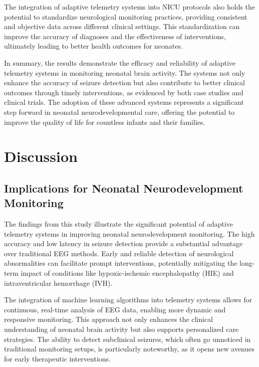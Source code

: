 \documentclass[12pt,journal,compsoc]{IEEEtran}
\begin{document}
The integration of adaptive telemetry systems into NICU protocols also holds the potential to standardize neurological monitoring practices, providing consistent and objective data across different clinical settings. This standardization can improve the accuracy of diagnoses and the effectiveness of interventions, ultimately leading to better health outcomes for neonates.

In summary, the results demonstrate the efficacy and reliability of adaptive telemetry systems in monitoring neonatal brain activity. The systems not only enhance the accuracy of seizure detection but also contribute to better clinical outcomes through timely interventions, as evidenced by both case studies and clinical trials. The adoption of these advanced systems represents a significant step forward in neonatal neurodevelopmental care, offering the potential to improve the quality of life for countless infants and their families.

\section{Discussion}

\subsection{Implications for Neonatal Neurodevelopment Monitoring}

The findings from this study illustrate the significant potential of adaptive telemetry systems in improving neonatal neurodevelopment monitoring. The high accuracy and low latency in seizure detection provide a substantial advantage over traditional EEG methods. Early and reliable detection of neurological abnormalities can facilitate prompt interventions, potentially mitigating the long-term impact of conditions like hypoxic-ischemic encephalopathy (HIE) and intraventricular hemorrhage (IVH).

The integration of machine learning algorithms into telemetry systems allows for continuous, real-time analysis of EEG data, enabling more dynamic and responsive monitoring. This approach not only enhances the clinical understanding of neonatal brain activity but also supports personalized care strategies. The ability to detect subclinical seizures, which often go unnoticed in traditional monitoring setups, is particularly noteworthy, as it opens new avenues for early therapeutic interventions.
\end{document}
